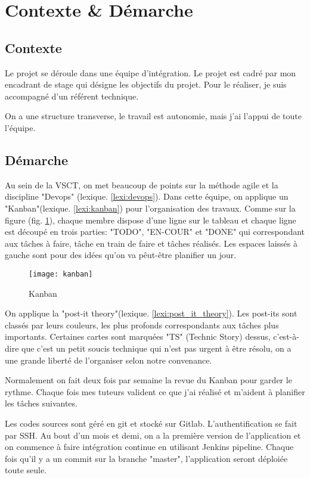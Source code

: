 \section{Contexte \& Démarche}
\subsection{Contexte}
Le projet se déroule dans une équipe d'intégration.
Le projet est cadré par mon encadrant de stage qui désigne les objectifs du projet.
Pour le réaliser, je suis accompagné d'un référent technique.

On a une structure transverse, le travail est autonomie, mais j'ai l'appui de toute l'équipe.

\subsection{Démarche}
Au sein de la VSCT, on met beaucoup de points sur la méthode agile et la discipline "Devops" (lexique. \ref{lexi:devops}).
Dans cette équipe, on applique un "Kanban"(lexique. \ref{lexi:kanban}) pour l'organisation des travaux.
Comme sur la figure (fig. \ref{fig:kanban}), chaque membre dispose d'une ligne sur le tableau et chaque ligne est découpé en trois parties: "TODO", "EN-COUR" et "DONE" qui correspondant aux tâches à faire, tâche en train de faire et tâches réalisés.
Les espaces laissés à gauche sont pour des idées qu'on va pêut-être planifier un jour.

\begin{figure}[ht]
\centering
\texttt{[image: kanban]}
\caption{Kanban}
\label{fig:kanban}
\end{figure}

On applique la "post-it theory"(lexique. \ref{lexi:post_it_theory}).
Les post-its sont classés par leurs couleurs, les plus profonds correspondants aux tâches plus importants.
Certaines cartes sont marquées "TS" (Technic Story) dessus, c'est-à-dire que c'est un petit soucis technique qui n'est pas urgent à être résolu, on a une grande liberté de l'organiser selon notre convenance.

Normalement on fait  deux fois par semaine la revue du Kanban pour garder le rythme.
Chaque fois mes tuteurs valident ce que j'ai réalisé et m'aident à planifier les tâches suivantes.

Les codes sources sont géré en git et stocké sur Gitlab. L'authentification se fait par SSH.
Au bout d'un mois et demi, on a la première version de l'application et on commence à faire intégration continue en utilisant Jenkins pipeline.
Chaque fois qu'il y a un commit sur la branche "master", l'application seront déploiée toute seule.

\clearpage
